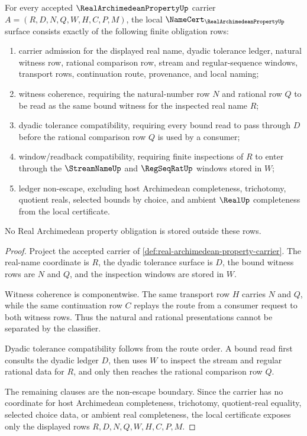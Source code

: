 \begin{theorem}
\label{thm:real-archimedean-property-namecert-obligations}
For every accepted $\RealArchimedeanPropertyUp$ carrier $A=(R,D,N,Q,W,H,C,P,M)$, the local $\NameCert_{\RealArchimedeanPropertyUp}$ surface consists exactly of the following finite obligation rows:
\begin{enumerate}
\item carrier admission for the displayed real name, dyadic tolerance ledger, natural witness row, rational comparison row, stream and regular-sequence windows, transport rows, continuation route, provenance, and local naming;
\item witness coherence, requiring the natural-number row $N$ and rational row $Q$ to be read as the same bound witness for the inspected real name $R$;
\item dyadic tolerance compatibility, requiring every bound read to pass through $D$ before the rational comparison row $Q$ is used by a consumer;
\item window/readback compatibility, requiring finite inspections of $R$ to enter through the $\StreamNameUp$ and $\RegSeqRatUp$ windows stored in $W$;
\item ledger non-escape, excluding host Archimedean completeness, trichotomy, quotient reals, selected bounds by choice, and ambient $\RealUp$ completeness from the local certificate.
\end{enumerate}
No Real Archimedean property obligation is stored outside these rows.
\end{theorem}
\begin{proof}
Project the accepted carrier of \autoref{def:real-archimedean-property-carrier}. The real-name coordinate is $R$, the dyadic tolerance surface is $D$, the bound witness rows are $N$ and $Q$, and the inspection windows are stored in $W$.

Witness coherence is componentwise. The same transport row $H$ carries $N$ and $Q$, while the same continuation row $C$ replays the route from a consumer request to both witness rows. Thus the natural and rational presentations cannot be separated by the classifier.

Dyadic tolerance compatibility follows from the route order. A bound read first consults the dyadic ledger $D$, then uses $W$ to inspect the stream and regular rational data for $R$, and only then reaches the rational comparison row $Q$.

The remaining clauses are the non-escape boundary. Since the carrier has no coordinate for host Archimedean completeness, trichotomy, quotient-real equality, selected choice data, or ambient real completeness, the local certificate exposes only the displayed rows $R,D,N,Q,W,H,C,P,M$.
\end{proof}

